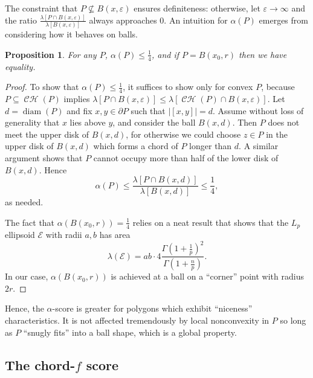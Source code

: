 \documentclass[]{jocg}
\newcommand{\EE}{\mathcal{E}}
\newcommand{\abs}[1]{|#1|}
\DeclareMathOperator{\diam}{\mathrm{diam}}
\DeclareMathOperator{\conv}{\mathcal{CH}}
\newtheorem{proposition}{Proposition}[section]
\theoremstyle{definition}
\theoremstyle{remark}
\begin{document}
The constraint that $P \not\subseteq B(x,\varepsilon)$ ensures definiteness:
otherwise, let $\varepsilon \to \infty$ and the ratio $\frac{\lambda[P \cap B(x,
\varepsilon)]}{\lambda[B(x, \varepsilon)]}$ always approaches $0$. An intuition
for $\alpha(P)$ emerges from considering how it behaves on balls.

\begin{proposition}
  For any $P$, $\alpha(P) \leq \frac{1}{4}$, and if $P = B(x_0, r)$
  then we have equality.
  \label{prop:alpha}
\end{proposition}

\begin{proof}
  To show that $\alpha(P) \leq \frac{1}{4}$, it suffices to show only for convex
  $P$, because $P \subseteq \conv(P)$ implies $\lambda[P \cap B(x, \varepsilon)]
  \leq \lambda[\conv(P) \cap B(x, \varepsilon)]$. Let $d = \diam (P)$ and fix
  $x,y \in \partial P$ such that $\abs{[x,y]} = d$. Assume without loss of
  generality that $x$ lies above $y$, and consider the ball $B(x, d)$. Then $P$
  does not meet the upper disk of $B(x,d)$, for otherwise we could choose $z \in
  P$ in the upper disk of $B(x,d)$ which forms a chord of $P$ longer than $d$.
  A similar argument shows that $P$ cannot occupy more than half of the lower
  disk of $B(x,d)$. Hence
  \begin{equation*}
    \alpha(P) \leq \frac{\lambda[P \cap B(x,d)]}{\lambda[B(x,d)]} \leq
    \frac{1}{4},
  \end{equation*}
  as needed.

  The fact that $\alpha(B(x_0, r)) = \frac{1}{4}$ relies on a neat
  result \cite{10.2307/30044198} that shows that the $L_p$
  ellipsoid $\EE$ with radii $a, b$ has area
  \begin{equation*}
    \lambda(\EE) = a b \cdot 4
    \frac{\Gamma(1+\frac{1}{p})^2}{\Gamma(1+\frac{n}{p})}.
  \end{equation*}
  In our case, $\alpha(B(x_0, r))$ is achieved at a ball on a ``corner'' point
  with radius $2r$.
\end{proof}

Hence, the $\alpha$-score is greater for polygons which exhibit ``niceness''
characteristics. It is not affected tremendously by local nonconvexity in $P$ so
long as $P$ ``snugly fits'' into a ball shape, which is a global property.

\subsection{The chord-$f$ score}
\end{document}
